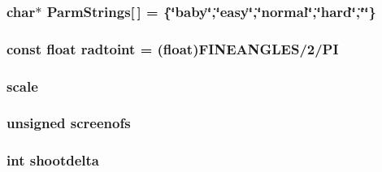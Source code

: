 \label{WL__MAIN_8C_aff857ab1c5f74eb9b19dffcad87e4dcb}
\hypertarget{WL__MAIN_8C_af8599e1c1fbb3afabbdaa22e7c4a94b0}{
\subsubsection[{ParmStrings}]{\setlength{\rightskip}{0pt plus 5cm}char$\ast$ {\bf ParmStrings}\mbox{[}$\,$\mbox{]} = \{\char`\"{}baby\char`\"{},\char`\"{}easy\char`\"{},\char`\"{}normal\char`\"{},\char`\"{}hard\char`\"{},\char`\"{}\char`\"{}\}}}
\label{WL__MAIN_8C_af8599e1c1fbb3afabbdaa22e7c4a94b0}
\hypertarget{WL__MAIN_8C_a96225f6b9b90cf6fe6087d34795b9037}{
\subsubsection[{radtoint}]{\setlength{\rightskip}{0pt plus 5cm}const float {\bf radtoint} = (float)FINEANGLES/2/PI}}
\label{WL__MAIN_8C_a96225f6b9b90cf6fe6087d34795b9037}
\hypertarget{WL__MAIN_8C_a849bfcd0a34b52dc70d3d9fa35a9ffc7}{
\subsubsection[{scale}]{ {\bf scale}}}
\label{WL__MAIN_8C_a849bfcd0a34b52dc70d3d9fa35a9ffc7}
\hypertarget{WL__MAIN_8C_abcc8c237b97739d0b0c39acc08dbf2fc}{
\subsubsection[{screenofs}]{\setlength{\rightskip}{0pt plus 5cm}unsigned {\bf screenofs}}}
\label{WL__MAIN_8C_abcc8c237b97739d0b0c39acc08dbf2fc}
\hypertarget{WL__MAIN_8C_aa63bb3fda19e484f4cbc31ad1760f408}{
\subsubsection[{shootdelta}]{\setlength{\rightskip}{0pt plus 5cm}int {\bf shootdelta}}}
